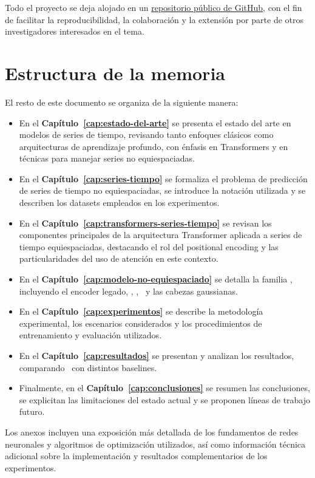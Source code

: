 Todo el proyecto se deja alojado en un \href{https://github.com/konnits/Memoria}{repositorio público de GitHub}, con el fin de facilitar la reproducibilidad, la colaboración y la extensión por parte de otros investigadores interesados en el tema.

\section{Estructura de la memoria}

El resto de este documento se organiza de la siguiente manera:

\begin{itemize}
    \item En el \textbf{Capítulo~\ref{cap:estado-del-arte}} se presenta el estado del arte en modelos de series de tiempo, revisando tanto enfoques clásicos como arquitecturas de aprendizaje profundo, con énfasis en Transformers y en técnicas para manejar series no equiespaciadas.
    \item En el \textbf{Capítulo~\ref{cap:series-tiempo}} se formaliza el problema de predicción de series de tiempo no equiespaciadas, se introduce la notación utilizada y se describen los datasets empleados en los experimentos.
    \item En el \textbf{Capítulo~\ref{cap:transformers-series-tiempo}} se revisan los componentes principales de la arquitectura Transformer aplicada a series de tiempo equiespaciadas, destacando el rol del positional encoding y las particularidades del uso de atención en este contexto.
    \item En el \textbf{Capítulo~\ref{cap:modelo-no-equiespaciado}} se detalla la familia \CTTransformer, incluyendo el encoder legado, \QueryCross, \ContinuousBasis, \CTSSM\ y las cabezas gaussianas.
    \item En el \textbf{Capítulo~\ref{cap:experimentos}} se describe la metodología experimental, los escenarios considerados y los procedimientos de entrenamiento y evaluación utilizados.
    \item En el \textbf{Capítulo~\ref{cap:resultados}} se presentan y analizan los resultados, comparando \CTTransformer\ con distintos baselines.
    \item Finalmente, en el \textbf{Capítulo~\ref{cap:conclusiones}} se resumen las conclusiones, se explicitan las limitaciones del estado actual y se proponen líneas de trabajo futuro.
\end{itemize}

Los anexos incluyen una exposición más detallada de los fundamentos de redes neuronales y algoritmos de optimización utilizados, así como información técnica adicional sobre la implementación y resultados complementarios de los experimentos.
